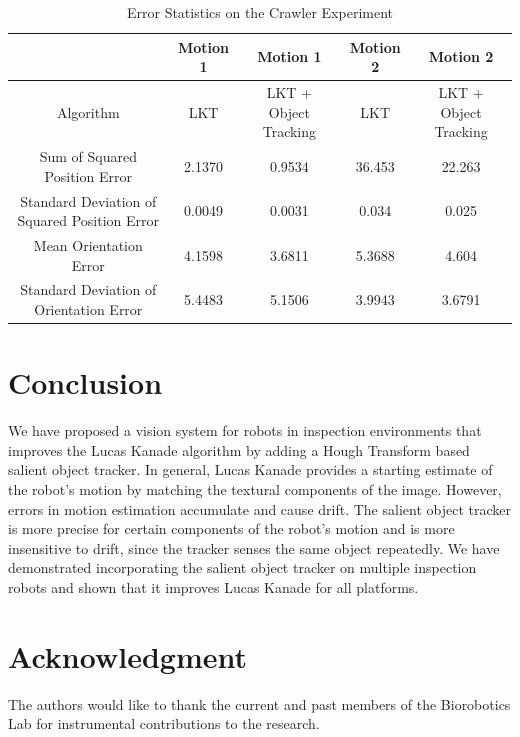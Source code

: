 \documentclass[letterpaper, 10 pt, conference]{ieeeconf}
\begin{document}
\begin{table}[tb]
	\centering
	\footnotesize
	\setlength{\tabcolsep}{.6em}
	\caption{Error Statistics on the Crawler Experiment}
	\label{table:crawler_results}
	\begin{tabular}{c|c|c|c|c|}
	\hline
	& Motion 1 & Motion 1 & Motion 2 & Motion 2\\
	\hline
	Algorithm & LKT & LKT + Object Tracking & LKT & LKT + Object Tracking\\ 
	\hline
	Sum of Squared Position Error & 2.1370 & 0.9534 & 36.453 & 22.263\\
	\hline
	Standard Deviation of Squared Position Error & 0.0049 & 0.0031 & 0.034 & 0.025\\
	\hline
	Mean Orientation Error & 4.1598 & 3.6811 & 5.3688 & 4.604\\
	\hline
	Standard Deviation of Orientation Error & 5.4483 & 5.1506 & 3.9943 & 3.6791\\
	\hline
	\end{tabular}
\end{table}

\section{Conclusion}

We have proposed a vision system for robots in inspection environments that improves the Lucas Kanade algorithm by adding a Hough Transform based salient object tracker. In general, Lucas Kanade provides a starting estimate of the robot's motion by matching the textural components of the image. However, errors in motion estimation accumulate and cause drift. The salient object tracker is more precise for certain components of the robot's motion and is more insensitive to drift, since the tracker senses the same object repeatedly. We have demonstrated incorporating the salient object tracker on multiple inspection robots and shown that it improves Lucas Kanade for all platforms.



\addtolength{\textheight}{-1cm}

\section*{Acknowledgment}

The authors would like to thank the current and past members of the Biorobotics Lab for instrumental contributions to the research.



\end{document}
